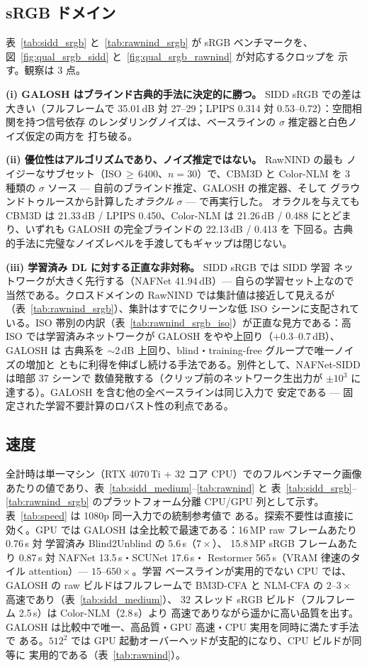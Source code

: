 \documentclass[10pt,twocolumn]{article}
\begin{document}
\subsection{sRGB ドメイン}\label{sec:srgb}
表~\ref{tab:sidd_srgb} と~\ref{tab:rawnind_srgb} が sRGB ベンチマークを、
図~\ref{fig:qual_srgb_sidd} と~\ref{fig:qual_srgb_rawnind} が対応するクロップを
示す。観察は 3 点。

\textbf{(i) GALOSH はブラインド古典的手法に決定的に勝つ。} SIDD sRGB での差は
大きい（フルフレームで 35.01\,dB 対 27--29；LPIPS 0.314 対 0.53--0.72）：空間相関を持つ信号依存
のレンダリングノイズは、ベースラインの $\sigma$ 推定器と白色ノイズ仮定の両方を
打ち破る。

\textbf{(ii) 優位性はアルゴリズムであり、ノイズ推定ではない。} RawNIND の最も
ノイジーなサブセット（ISO\,$\geq$\,6400、$n{=}30$）で、CBM3D と Color-NLM を
3 種類の $\sigma$ ソース --- 自前のブラインド推定、GALOSH の推定器、そして
グラウンドトゥルースから計算した\emph{オラクル} $\sigma$ --- で再実行した。
オラクルを与えても CBM3D は 21.33\,dB / LPIPS 0.450、Color-NLM は 21.26\,dB /
0.488 にとどまり、いずれも GALOSH の完全ブラインドの 22.13\,dB / 0.413 を
下回る。古典的手法に完璧なノイズレベルを手渡してもギャップは閉じない。

\textbf{(iii) 学習済み DL に対する正直な非対称。} SIDD sRGB では SIDD 学習
ネットワークが大きく先行する（NAFNet 41.94\,dB）--- 自らの学習セット上なので
当然である。クロスドメインの RawNIND では集計値は接近して見えるが
（表~\ref{tab:rawnind_srgb}）、集計はすでにクリーンな低 ISO シーンに支配されて
いる。ISO 帯別の内訳（表~\ref{tab:rawnind_srgb_iso}）が正直な見方である：高 ISO
では学習済みネットワークが GALOSH をやや上回り（+0.3--0.7\,dB）、GALOSH は
古典系を $\sim$2\,dB 上回り、blind・training-free グループで唯一ノイズの増加と
ともに利得を伸ばし続ける手法である。別件として、NAFNet-SIDD は暗部 37 シーンで
数値発散する（クリップ前のネットワーク生出力が $\pm10^3$ に達する）。GALOSH を含む他の全ベースラインは同じ入力で
安定である --- 固定された学習不要計算のロバスト性の利点である。

\subsection{速度}\label{sec:speed}
全計時は単一マシン（RTX 4070\,Ti + 32 コア CPU）でのフルベンチマーク画像
あたりの値であり、表~\ref{tab:sidd_medium}--\ref{tab:rawnind} と
表~\ref{tab:sidd_srgb}--\ref{tab:rawnind_srgb} のプラットフォーム分離
CPU/GPU 列として示す。表~\ref{tab:speed} は 1080p 同一入力での統制参考値で
ある。探索不要性は直接に効く。GPU では GALOSH は全比較で最速である：16\,MP
raw フレームあたり 0.76\,s 対 学習済み Blind2Unblind の 5.6\,s（$7\times$）、
15.8\,MP sRGB フレームあたり 0.87\,s 対 NAFNet 13.5\,s・SCUNet 17.6\,s・
Restormer 565\,s（VRAM 律速のタイル attention）--- $15$--$650\times$。学習
ベースラインが実用的でない CPU では、GALOSH の raw ビルドはフルフレームで
BM3D-CFA と NLM-CFA の $2$--$3\times$ 高速であり（表~\ref{tab:sidd_medium}）、
32 スレッド sRGB ビルド（フルフレーム 2.5\,s）は Color-NLM（2.8\,s）より
高速でありながら遥かに高い品質を出す。GALOSH は比較中で唯一、高品質・GPU 高速・CPU 実用を同時に満たす手法で
ある。$512^2$ では GPU 起動オーバーヘッドが支配的になり、CPU ビルドが同等に
実用的である（表~\ref{tab:rawnind}）。
\end{document}
